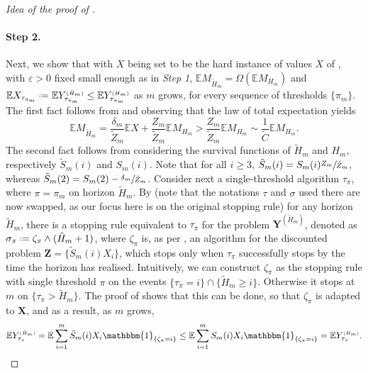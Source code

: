 \documentclass[11pt, a4paper, twoside]{article}
\newcommand*{\defeq}{\mathrel{\vcenter{\baselineskip0.5ex \lineskiplimit0pt
			\hbox{\scriptsize.}\hbox{\scriptsize.}}}=}
\newcommand{\ssup}[1]{{\scriptscriptstyle{({#1})}}}
\newcommand{\eps}{\varepsilon}
\newcommand{\EE}{\mathbb{E}}
\newcommand{\YY}{\mathbf{Y}}
\newcommand{\XX}{\mathbf{X}}
\newcommand{\DZ}{\mathbf{Z}}
\newcommand{\II}{\mathbbm{1}}
\numberwithin{equation}{section}
\begin{document}
\begin{proof}[Idea of the proof of ]
		\paragraph{Step 2.} Next, we show that with $X$ being set to be the hard instance of values $X$ of , with $\eps>0$ fixed small enough as in \emph{Step 1}, $\EE M_{\tilde{H}_m}=\Omega (\EE M_{H_m})$ and $\EE X_{\tau_{\pi_m}}\defeq \EE Y_{\tau_{\pi_m}}^\ssup{\tilde{H}_m}\le \EE Y_{\tau_{\pi_m}}^\ssup{H_m}$ as $m$ grows, for every sequence of thresholds $\{\pi_m\}$. The first fact follows from  and observing that the law of total expectation yields
		\[\EE M_{\tilde{H}_m}=\frac{\delta_m}{\tilde{Z}_m} \EE X +\frac{Z_m}{\tilde{Z}_m}\EE M_{H_m}>\frac{Z_m}{\tilde{Z}_m}\EE M_{H_m}\sim\frac{1}{\tilde{C}}\EE M_{H_m}.\] The second fact follows from considering the survival functions of $\tilde{H}_m$ and $H_m$, respectively $\tilde{S}_m(i)$ and $S_m(i)$. Note that for all $i\ge 3$, $\tilde{S}_m(i)=S_m(i)\sfrac{Z_m}{\tilde{Z}_m}$, whereas $\tilde{S}_m(2)=S_m(2)-\sfrac{\delta_m}{\tilde{Z}_m}$. Consider next a single-threshold algorithm $\tau_\pi$, where $\pi=\pi_m$ on horizon $\tilde{H}_m$. By  (note that the notations $\tau$ and $\sigma$ used there are now swapped, as our focus here is on the original stopping rule) for any horizon $\tilde{H}_m$, there is a stopping rule equivalent to $\tau_\pi$ for the problem $\YY^\ssup{\tilde{H}_m}$, denoted as $\sigma_\pi\defeq\zeta_\pi\wedge (\tilde{H}_m+1)$, where $\zeta_\pi$ is, as per , an algorithm for the discounted problem $\DZ=\{\tilde{S}_m(i)X_i\}$, which stops only when $\tau_\pi$ successfully stops by the time the horizon has realised. Intuitively, we can construct $\zeta_\pi$ as the stopping rule with single threshold $\pi$ on the events $\{\tau_\pi=i\}\cap\{\tilde{H}_m\ge i\}$. Otherwise it stops at $m$ on $\{\tau_\pi>\tilde{H}_m\}$. The proof of  shows that this can be done, so that $\zeta_\pi$ is adapted to $\XX$, and as a result, as $m$ grows, 
		\[\EE Y_{\tau_\pi}^\ssup{\tilde{H}_m}=\EE\sum_{i=1}^m \tilde{S}_m(i)X_i\II_{\{\zeta_\pi=i\}}\le\EE\sum_{i=1}^m S_m(i)X_i\II_{\{\zeta_\pi=i\}}=\EE Y_{\tau_\pi}^\ssup{H_m}.\]
		

\end{proof}
\end{document}
